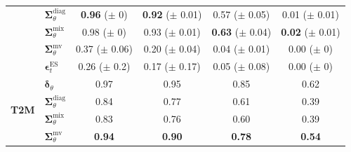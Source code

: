 \begin{tabular}{|l|l|cccc|}
        & $\bm\Sigma_\theta^{\mathrm{diag}}$ & \makecell{\textbf{0.96} \\ ($\pm$ 0)} & \makecell{\textbf{0.92} \\ ($\pm$ 0.01)} & \makecell{0.57 \\ ($\pm$ 0.05)} & \makecell{0.01 \\ ($\pm$ 0.01)} \\
        & $\bm\Sigma_\theta^{\mathrm{mix}}$ & \makecell{0.98 \\ ($\pm$ 0)} & \makecell{0.93 \\ ($\pm$ 0.01)} & \makecell{\textbf{0.63} \\ ($\pm$ 0.04)} & \makecell{\textbf{0.02} \\ ($\pm$ 0.01)} \\
        & $\bm\Sigma_\theta^{\mathrm{mv}}$ & \makecell{0.37 \\ ($\pm$ 0.06)} & \makecell{0.20 \\ ($\pm$ 0.04)} & \makecell{0.04 \\ ($\pm$ 0.01)} & \makecell{0.00 \\ ($\pm$ 0)} \\
        & $\bm\epsilon_t^\mathrm{ES}$ & \makecell{0.26 \\ ($\pm$ 0.2)} & \makecell{0.17 \\ ($\pm$ 0.17)} & \makecell{0.05 \\ ($\pm$ 0.08)} & \makecell{0.00 \\ ($\pm$ 0)} \\
        \midrule
        \multirow{4}{*}{\textbf{T2M}}
        & $\bm\delta_\theta$ & 0.97 & 0.95 & 0.85 & 0.62 \\
        & $\bm\Sigma_\theta^{\mathrm{diag}}$ & 0.84 & 0.77 & 0.61 & 0.39 \\
        & $\bm\Sigma_\theta^{\mathrm{mix}}$ & 0.83 & 0.76 & 0.60 & 0.39 \\
        & $\bm\Sigma_\theta^{\mathrm{mv}}$ & \textbf{0.94} & \textbf{0.90} & \textbf{0.78} & \textbf{0.54} \\
        \bottomrule
    \end{tabular}
